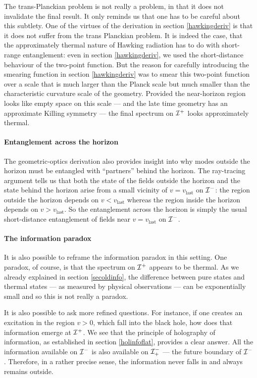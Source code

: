 \documentclass[12pt]{article}
\def \scrip{{\cal I}^{+}}
\def \scrim{{\cal I}^{-}}
\def \scrimfuture{{\cal I}^{-}_{+}}
\begin{document}
The trans-Planckian problem is not really a problem, in that it does not invalidate the final result. It only reminds us that one has to be careful about this subtlety. One of the virtues of the derivation in section \ref{hawkingderiv} is that it does not suffer from the trans Planckian problem. It is indeed the case, that the approximately thermal nature of Hawking radiation has to do with short-range entanglement: even in section \ref{hawkingderiv}, we used the short-distance behaviour of the two-point function. But the reason for carefully introducing the smearing function in section \ref{hawkingderiv} was to smear this two-point function over a scale that is much larger than the Planck scale but much smaller than the characteristic curvature scale of the geometry. Provided the near-horizon region looks like empty space on this scale --- and the late time geometry has an approximate Killing symmetry ---  the final spectrum on $\scrip$  looks approximately thermal.

\paragraph{\bf Entanglement across the horizon \\}
The geometric-optics derivation also provides insight into why modes outside the horizon must be entangled with ``partners'' behind the horizon. The ray-tracing argument tells us that both the state of the fields outside the horizon and the state behind the horizon arise from a small vicinity of $v = v_{\text{last}}$ on $\scrim$:  the region outside the horizon depends on $v < v_{\text{last}}$ whereas the region inside the horizon depends on $v > v_{\text{last}}$. So the entanglement across the horizon is simply the usual short-distance entanglement of fields near $v = v_{\text{last}}$ on $\scrim$. 
 
\paragraph{\bf The information paradox \\}
It is also possible to  reframe the information paradox in this setting.  One paradox, of course, is that the spectrum on $\scrip$ appears to be thermal. As we already explained in section \ref{secoldinfo}, the difference between pure states
 and thermal states --- as measured by physical observations --- can be exponentially small and so this is not really a paradox. 

It is also possible to ask more refined questions. For instance, if one creates an excitation in the region $v > 0$, which fall into the black hole, how does that information emerge at $\scrip$. We see that the principle of holography of information, as established in section \ref{holinfoflat}, provides a clear answer. All the information available on $\scrim$ is also available on $\scrimfuture$ --- the future boundary of $\scrim$. Therefore, in a rather precise sense, the information never falls in and always remains outside. 
\end{document}
